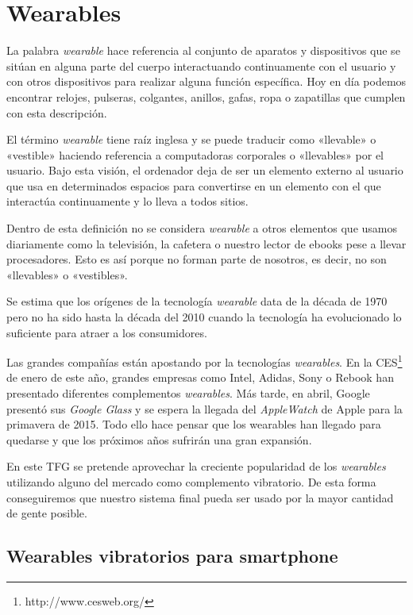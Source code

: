 \section{Wearables}

La palabra \emph{wearable} hace referencia al conjunto de aparatos y dispositivos que se sitúan en
alguna parte del cuerpo interactuando continuamente con el usuario y con otros dispositivos para
realizar alguna función específica. Hoy en día podemos encontrar relojes, pulseras, colgantes,
anillos, gafas, ropa o zapatillas que cumplen con esta descripción.

El término \emph{wearable} tiene raíz inglesa y se puede traducir como «llevable» o «vestible»
haciendo referencia a computadoras corporales o «llevables» por el usuario. Bajo esta visión, el
ordenador deja de ser un elemento externo al usuario que usa en determinados espacios para
convertirse en un elemento con el que interactúa continuamente y lo lleva a todos sitios.

Dentro de esta definición no se considera \emph{wearable} a otros elementos que usamos diariamente
como la televisión, la cafetera o nuestro lector de ebooks pese a llevar procesadores. Esto es así
porque no forman parte de nosotros, es decir, no son «llevables» o «vestibles».

Se estima que los orígenes de la tecnología \emph{wearable} data de la década de 1970 pero no ha
sido hasta la década del 2010 cuando la tecnología ha evolucionado lo suficiente para atraer a los
consumidores.

Las grandes compañías están apostando por la tecnologías \emph{wearables}.  En la
\acf{CES}\footnote{http://www.cesweb.org/} de enero de este año, grandes empresas como Intel,
Adidas, Sony o Rebook han presentado diferentes complementos \emph{wearables}. Más tarde, en abril,
Google presentó sus \emph{Google Glass} y se espera la llegada del \emph{AppleWatch} de Apple para
la primavera de 2015. Todo ello hace pensar que los wearables han llegado para quedarse y que los
próximos años sufrirán una gran expansión.

En este \acs{TFG} se pretende aprovechar la creciente popularidad de los \emph{wearables} utilizando
alguno del mercado como complemento vibratorio. De esta forma conseguiremos que nuestro sistema
final pueda ser usado por la mayor cantidad de gente posible.

\subsection{Wearables vibratorios para smartphone}
\label{sec:wearables}

